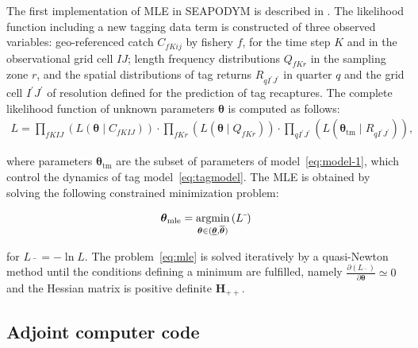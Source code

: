 The first implementation of MLE in SEAPODYM is described in \citet{Senina08}. The likelihood function including a new tagging data term is constructed of three observed variables: geo-referenced catch $C_{fKij}$ by fishery $f$, for the time step $K$ and in the observational grid cell $IJ$; length frequency distributions $Q_{fKr}$ in the sampling zone $r$, and the spatial distributions of tag returns $R_{qI^{'}J^{'}}$ in quarter $q$ and the grid cell $I^{'}J^{'}$ of resolution defined for the prediction of tag recaptures. The complete likelihood function of unknown parameters $\boldsymbol \theta$ is computed as follows:
\begin{align}
L = \prod_{fKIJ} \left(L(\boldsymbol \theta \mid C_{fKIJ})\right) \cdot \prod_{fKr} \left(L(\boldsymbol \theta \mid Q_{fKr} )\right) \cdot  \prod_{qI^{'}J^{'}} \left(L(\boldsymbol \theta_{\text{tm}} \mid R_{qI^{'}J^{'}} )\right),
\end{align}

\noindent where parameters $\boldsymbol \theta_{\text{tm}}$ are the subset of parameters of model~\ref{eq:model-1}, which control the dynamics of tag model~\ref{eq:tagmodel}. The MLE is obtained by solving the following constrained minimization problem:

\begin{equation}
\boldsymbol\theta_{\text{mle}} =  \argmin \limits_{\boldsymbol \theta \in (\underline{\boldsymbol \theta},\overline{\boldsymbol \theta})}\left( L\bar{\text{ }} \right)
\end{equation}\label{eq:mle}

\noindent for $L\bar{\text{ }}=-\ln L$. The problem~\ref{eq:mle} is solved iteratively by a quasi-Newton method until the conditions defining a minimum are fulfilled, namely $\frac{\partial (L\bar{\text{ }})}{\partial \boldsymbol \theta} \simeq 0$ and the Hessian matrix is positive definite $\mathbf{H}_{++}$. 

\subsection{Adjoint computer code}\label{sec:adjoint}

